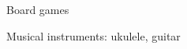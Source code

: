 \begin{cventries}
  \cventry
    {}
    {}
    {}
    {}
    {
      \begin{cvitems}
        \item {Board games}
        \item {Musical instruments: ukulele, guitar}
      \end{cvitems}
    }
\end{cventries}

